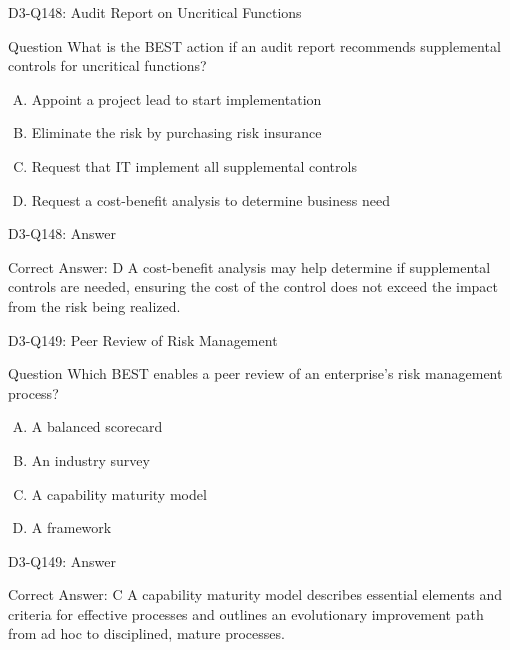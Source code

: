 \documentclass{beamer}
\begin{document}
	\begin{frame}{D3-Q148: Audit Report on Uncritical Functions}
		\begin{block}{Question}
			What is the BEST action if an audit report recommends supplemental controls for uncritical functions?
		\end{block}
		\begin{enumerate}[(A)]
			\item Appoint a project lead to start implementation
			\item Eliminate the risk by purchasing risk insurance
			\item Request that IT implement all supplemental controls
			\item Request a cost-benefit analysis to determine business need
		\end{enumerate}
	\end{frame}
	\begin{frame}{D3-Q148: Answer}
		\begin{block}{Correct Answer: D}
			A cost-benefit analysis may help determine if supplemental controls are needed, ensuring the cost of the control does not exceed the impact from the risk being realized.
		\end{block}
	\end{frame}
	
	\begin{frame}{D3-Q149: Peer Review of Risk Management}
		\begin{block}{Question}
			Which BEST enables a peer review of an enterprise's risk management process?
		\end{block}
		\begin{enumerate}[(A)]
			\item A balanced scorecard
			\item An industry survey
			\item A capability maturity model
			\item A framework
		\end{enumerate}
	\end{frame}
	\begin{frame}{D3-Q149: Answer}
		\begin{block}{Correct Answer: C}
			A capability maturity model describes essential elements and criteria for effective processes and outlines an evolutionary improvement path from ad hoc to disciplined, mature processes.
		\end{block}
	\end{frame}
	
\end{document}
